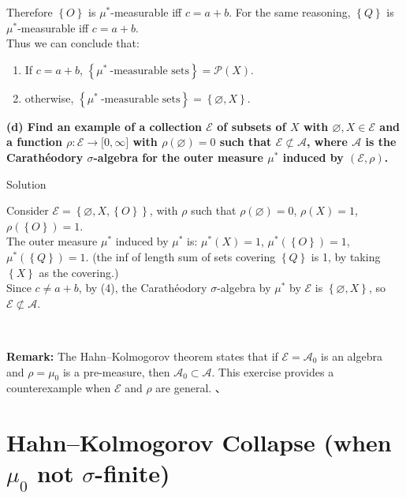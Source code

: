 Therefore \(\left\{ O \right\}\) is \(\mu^{\ast}\)-measurable iff \(c = a + b\). For the same reasoning, \(\left\{ Q \right\}\) is \(\mu^{\ast}\)-measurable iff \(c = a + b\).\\
Thus we can conclude that:

\begin{enumerate}
\item
  If \(c = a + b\), \(\left\{ {\mu^{\ast}\ \text{-measurable sets}} \right\} = \mathcal{P}(X)\).
\item
  otherwise, \(\left\{ {\mu^{\ast}\ \text{-measurable sets}} \right\} = \left\{ {\varnothing,X} \right\}\).
\end{enumerate}

\textbf{(d) Find an example of a collection \(\mathcal{E}\) of subsets of \(X\) with \(\varnothing,X \in \mathcal{E}\) and a function \(\rho:\mathcal{E}\rightarrow\lbrack 0,\infty\rbrack\) with \(\rho(\varnothing) = 0\) such that \(\mathcal{E} \not\subset \mathcal{A}\), where \(\mathcal{A}\) is the Carathéodory \(\sigma\)-algebra for the outer measure \(\mu^{\ast}\) induced by \((\mathcal{E},\rho)\).}

\begin{qlsolution}{Solution}

Consider \(\mathcal{E} = \left\{ {\varnothing,X,\left\{ O \right\}} \right\}\), with \(\rho\) such that \(\rho(\varnothing) = 0\), \(\rho(X) = 1\), \(\rho(\left\{ O \right\}) = 1\).\\
The outer measure \(\mu^{\ast}\) induced by \(\mu^{\ast}\) is: \(\mu^{\ast}(X) = 1\), \(\mu^{\ast}(\left\{ O \right\}) = 1\), \(\mu^{\ast}(\left\{ Q \right\}) = 1\). (the inf of length sum of sets covering \(\left\{ Q \right\}\) is 1, by taking \(\left\{ X \right\}\) as the covering.)\\
Since \(c \neq a + b\), by (4), the Carathéodory \(\sigma\)-algebra by \(\mu^{\ast}\) by \(\mathcal{E}\) is \(\left\{ {\varnothing,X} \right\}\), so \(\mathcal{E} \not\subset \mathcal{A}\).\\
\strut \\

\end{qlsolution}

\textbf{Remark:} The Hahn--Kolmogorov theorem states that if \(\mathcal{E} = \mathcal{A}_{0}\) is an algebra and \(\rho = \mu_{0}\) is a pre-measure, then \(\mathcal{A}_{0} \subset \mathcal{A}\). This exercise provides a counterexample when \(\mathcal{E}\) and \(\rho\) are general. 、

\section{\texorpdfstring{Hahn--Kolmogorov Collapse (when \(\mu_{0}\) not \(\sigma\)-finite)}{Hahn--Kolmogorov Collapse (when \textbackslash mu\_\{0\} not \textbackslash sigma-finite)}}\label{hahnkolmogorov-collapse-when-mu_0-not-sigma-finite}

